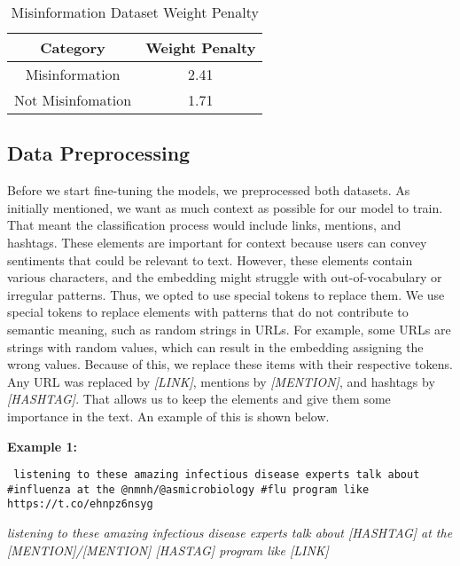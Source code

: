 \begin{table}[H]
	\centering
	\caption{Misinformation Dataset Weight Penalty}
	\begin{tabular}{||c | c||} 
		\hline
		\textbf{Category} & \textbf{Weight Penalty} \\ [1.5ex] 
		\hline
		Misinformation & 2.41  \\ [1ex]
		\hline
		Not Misinfomation & 1.71  \\[1ex]
		\hline
	\end{tabular}
	\label{table:misinformationweight}
\end{table}


\subsection{Data Preprocessing}
Before we start fine-tuning the models, we preprocessed both datasets. As initially mentioned, we want as much context as possible for our model to train. That meant the classification
process would include links, mentions, and hashtags. These elements are important for context because users can convey sentiments that could be relevant to text. However, these elements contain various characters, and the embedding might struggle with out-of-vocabulary or irregular
patterns. Thus, we opted to use special tokens to replace them. We use special tokens to replace elements with patterns that do not contribute to semantic meaning, such as random
strings in URLs. For example, some URLs are strings with random values, which can result in the embedding assigning the wrong values. Because of this, we replace these items with
their respective tokens. Any URL was replaced by \textit{[LINK]}, mentions by \textit{[MENTION]}, and hashtags by \textit{[HASHTAG]}. That allows us to keep the elements and give them some importance in the text. An example of this is shown below.

\noindent \textbf{Example 1:}
 \begin{tcolorbox}[colback=gray!10, colframe=black!70, title=Original Text]
	\texttt{%
listening to these amazing infectious disease experts talk about \#influenza at the @nmnh/@asmicrobiology \#flu program like https://t.co/ehnpz6nsyg
	}
\end{tcolorbox}

\begin{tcolorbox}[colback=white, colframe=black!70, title=Preprocessed Result]
	\textit{%
listening to these amazing infectious disease experts talk about [HASHTAG] at the [MENTION]/[MENTION] [HASTAG] program like [LINK]
	}
\end{tcolorbox}


